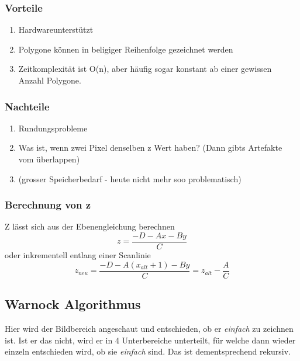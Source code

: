 \subsubsection{Vorteile}
\begin{enumerate}
	\item Hardwareunterstützt
	\item Polygone können in beligiger Reihenfolge gezeichnet werden
	\item Zeitkomplexität ist O(n), aber häufig sogar konstant ab einer gewissen Anzahl Polygone.
\end{enumerate}
\subsubsection{Nachteile}
\begin{enumerate}
	\item Rundungsprobleme
	\item Was ist, wenn zwei Pixel denselben z Wert haben? (Dann gibts Artefakte vom überlappen)
	\item (grosser Speicherbedarf - heute nicht mehr soo problematisch)
\end{enumerate}
\subsubsection{Berechnung von z}
Z lässt sich aus der Ebenengleichung berechnen
\begin{displaymath}
	z = \frac{-D-Ax-By}{C}
\end{displaymath}
oder inkrementell entlang einer Scanlinie
\begin{displaymath}
	z_{neu} = \frac{-D-A(x_{alt}+1)-By}{C}=z_{alt}-\frac{A}{C}
\end{displaymath}
\subsection{Warnock Algorithmus}
Hier wird der Bildbereich angeschaut und entschieden, ob er \textit{einfach} zu zeichnen ist. Ist er das nicht, wird er in 4 Unterbereiche unterteilt, für welche dann wieder einzeln entschieden wird, ob sie \textit{einfach} sind. Das ist dementsprechend rekursiv.
